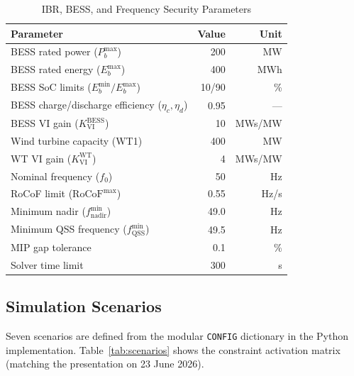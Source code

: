 \documentclass[journal]{IEEEtran}
\begin{document}
\begin{table}[!t]
\renewcommand{\arraystretch}{1.2}
\caption{IBR, BESS, and Frequency Security Parameters}
\label{tab:ibr}
\centering\footnotesize
\begin{tabular}{lrr}
\toprule
Parameter & Value & Unit \\
\midrule
BESS rated power ($P_{b}^{\max}$)              & 200   & MW      \\
BESS rated energy ($E_{b}^{\max}$)             & 400   & MWh     \\
BESS SoC limits ($E_{b}^{\min}/E_{b}^{\max}$) & 10/90 & \%      \\
BESS charge/discharge efficiency ($\eta_c,\eta_d$) & 0.95 & ---  \\
BESS VI gain ($K_{\text{VI}}^{\text{BESS}}$)  & 10    & MWs/MW  \\
Wind turbine capacity (WT1)                    & 400   & MW      \\
WT VI gain ($K_{\text{VI}}^{\text{WT}}$)       & 4     & MWs/MW  \\
Nominal frequency ($f_0$)                      & 50    & Hz      \\
RoCoF limit ($\text{RoCoF}^{\max}$)           & 0.55  & Hz/s    \\
Minimum nadir ($f_{\text{nadir}}^{\min}$)      & 49.0  & Hz      \\
Minimum QSS frequency ($f_{\text{QSS}}^{\min}$) & 49.5 & Hz    \\
MIP gap tolerance                              & 0.1   & \%      \\
Solver time limit                              & 300   & s       \\
\bottomrule
\end{tabular}
\end{table}

\subsection{Simulation Scenarios}

Seven scenarios are defined from the modular \texttt{CONFIG}
dictionary in the Python implementation.
Table~\ref{tab:scenarios} shows the constraint activation matrix
(matching the presentation on 23 June 2026).
\end{document}
